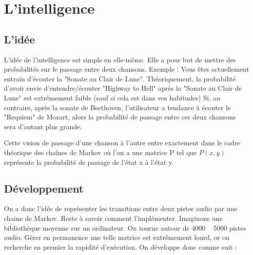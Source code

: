 \documentclass{report}
\begin{document}
\section*{L'intelligence}
\subsection*{L'idée}

L'idée de l'intelligence est simple en elle-même. Elle a pour but de mettre des probabilités sur le passage entre deux chansons. Exemple : Vous êtes actuellement entrain d'écouter la "Sonate au Clair de Lune". Théoriquement, la probabilité d'avoir envie d'entendre/écouter "Highway to Hell" après la "Sonate au Clair de Lune" est extrêmement faible (sauf si cela est dans vos habitudes)
Si, au contraire, après la sonate de Beethoven, l'utilisateur a tendance à écouter le "Requiem" de Mozart, alors la probabilité de passage entre ces deux chansons sera d'autant plus grande.

Cette vision de passage d'une chanson à l'autre entre exactement dans le cadre théorique des chaînes de Markov où l'on a une matrice P tel que $P(x,y)$ représente la probabilité de passage de l'état x à l'état y.

\subsection*{Développement}

On a donc l'idée de représenter les transitions entre deux pistes audio par une chaine de Markov. Reste à savoir comment l'implémenter. Imaginons une bibliothèque moyenne sur un ordinateur. On tourne autour de 4000 ~ 5000 pistes audio. Gérer en permanence une telle matrice est extrêmement lourd, or on recherche en premier la rapidité d'exécution. On développe donc comme suit :
\end{document}
